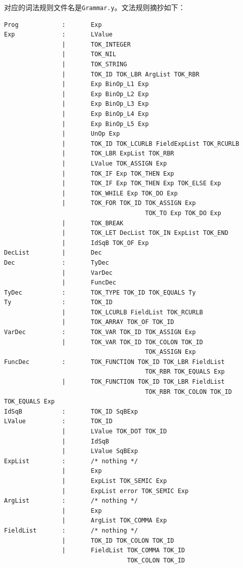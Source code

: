 \newpage

对应的词法规则文件名是\texttt{Grammar.y}。文法规则摘抄如下：

\begin{verbatim}
Prog            :       Exp
Exp             :       LValue
                |       TOK_INTEGER
                |       TOK_NIL
                |       TOK_STRING
                |       TOK_ID TOK_LBR ArgList TOK_RBR
                |       Exp BinOp_L1 Exp
                |       Exp BinOp_L2 Exp
                |       Exp BinOp_L3 Exp
                |       Exp BinOp_L4 Exp
                |       Exp BinOp_L5 Exp
                |       UnOp Exp
                |       TOK_ID TOK_LCURLB FieldExpList TOK_RCURLB
                |       TOK_LBR ExpList TOK_RBR
                |       LValue TOK_ASSIGN Exp
                |       TOK_IF Exp TOK_THEN Exp
                |       TOK_IF Exp TOK_THEN Exp TOK_ELSE Exp
                |       TOK_WHILE Exp TOK_DO Exp
                |       TOK_FOR TOK_ID TOK_ASSIGN Exp
                                       TOK_TO Exp TOK_DO Exp
                |       TOK_BREAK
                |       TOK_LET DecList TOK_IN ExpList TOK_END
                |       IdSqB TOK_OF Exp
DecList         |       Dec
Dec             :       TyDec
                |       VarDec
                |       FuncDec
TyDec           :       TOK_TYPE TOK_ID TOK_EQUALS Ty
Ty              :       TOK_ID
                |       TOK_LCURLB FieldList TOK_RCURLB
                |       TOK_ARRAY TOK_OF TOK_ID
VarDec          :       TOK_VAR TOK_ID TOK_ASSIGN Exp
                |       TOK_VAR TOK_ID TOK_COLON TOK_ID
                                       TOK_ASSIGN Exp
FuncDec         :       TOK_FUNCTION TOK_ID TOK_LBR FieldList
                                       TOK_RBR TOK_EQUALS Exp
                |       TOK_FUNCTION TOK_ID TOK_LBR FieldList
                                       TOK_RBR TOK_COLON TOK_ID TOK_EQUALS Exp
IdSqB           :       TOK_ID SqBExp
LValue          :       TOK_ID
                |       LValue TOK_DOT TOK_ID
                |       IdSqB
                |       LValue SqBExp
ExpList         :       /* nothing */
                |       Exp
                |       ExpList TOK_SEMIC Exp
                |       ExpList error TOK_SEMIC Exp
ArgList         :       /* nothing */
                |       Exp
                |       ArgList TOK_COMMA Exp
FieldList       :       /* nothing */
                |       TOK_ID TOK_COLON TOK_ID
                |       FieldList TOK_COMMA TOK_ID
                                  TOK_COLON TOK_ID

\end{verbatim}

